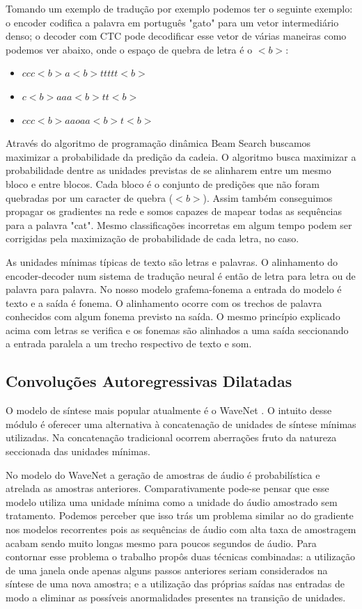 Tomando um exemplo de tradução por exemplo podemos ter o seguinte exemplo: o encoder codifica a palavra em português "gato" para um vetor intermediário denso; o decoder com CTC pode decodificar esse vetor de várias maneiras como podemos ver abaixo, onde o espaço de quebra de letra é o $<b>$:
\begin{itemize}
    \item $ccc<b>a<b>ttttt<b>$
    \item $c<b>aaa<b>tt<b>$
    \item $ccc<b>aaoaa<b>t<b>$
\end{itemize}
Através do algoritmo de programação dinâmica Beam Search buscamos maximizar a probabilidade da predição da cadeia. O algoritmo busca maximizar a probabilidade dentre as unidades previstas de se alinharem entre um mesmo bloco e entre blocos. Cada bloco é o conjunto de predições que não foram quebradas por um caracter de quebra ($<b>$). Assim também conseguimos propagar os gradientes na rede e somos capazes de mapear todas as sequências para a palavra "cat". Mesmo classificações incorretas em algum tempo podem ser corrigidas pela maximização de probabilidade de cada letra, no caso.

As unidades mínimas típicas de texto são letras e palavras. O alinhamento do encoder-decoder num sistema de tradução neural é então de letra para letra ou de palavra para palavra. No nosso modelo grafema-fonema a entrada do modelo é texto e a saída é fonema. O alinhamento ocorre com os trechos de palavra conhecidos com algum fonema previsto na saída. O mesmo princípio explicado acima com letras se verifica e os fonemas são alinhados a uma saída seccionando a entrada paralela a um trecho respectivo de texto e som.


\subsection{Convoluções Autoregressivas Dilatadas}
O modelo de síntese mais popular atualmente é o WaveNet \cite{wavenet}. O intuito desse módulo é oferecer uma alternativa à concatenação de unidades de síntese mínimas utilizadas. Na concatenação tradicional ocorrem aberrações fruto da natureza seccionada das unidades mínimas.

No modelo do WaveNet a geração de amostras de áudio é probabilística e atrelada as amostras anteriores. Comparativamente pode-se pensar que esse modelo utiliza uma unidade mínima como a unidade do áudio amostrado sem tratamento. Podemos perceber que isso trás um problema similar ao do gradiente nos modelos recorrentes pois as sequências de áudio com alta taxa de amostragem acabam sendo muito longas mesmo para poucos segundos de áudio. Para contornar esse problema o trabalho propôs duas técnicas combinadas: a utilização de uma janela onde apenas alguns passos anteriores seriam considerados na síntese de uma nova amostra; e a utilização das próprias saídas nas entradas de modo a eliminar as possíveis anormalidades presentes na transição de unidades.


